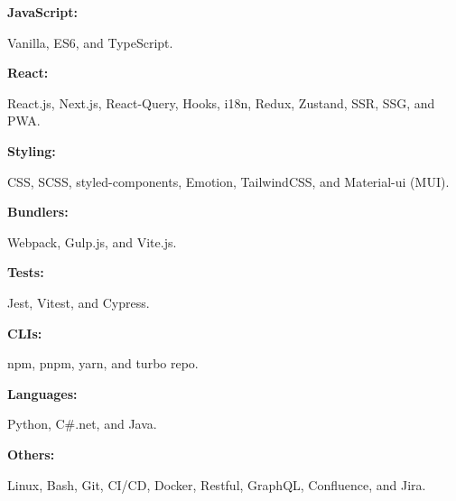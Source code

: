 \documentclass[8pt]{developercv} %
\begin{document}
    \vspace{-10 pt}
    \begin{minipage}[t]{0.1\textwidth}
        \textbf{JavaScript:}
    \end{minipage}
    \hfill
    \begin{minipage}[t]{0.85\textwidth}
        Vanilla, ES6, and TypeScript.
    \end{minipage}
    \begin{minipage}[t]{0.1\textwidth}
        \textbf{React:}
    \end{minipage}
    \hfill
    \begin{minipage}[t]{0.85\textwidth}
        React.js, Next.js, React-Query, Hooks, i18n, Redux, Zustand, SSR, SSG, and PWA.
    \end{minipage}
    \begin{minipage}[t]{0.1\textwidth}
        \textbf{Styling:}
    \end{minipage}
    \hfill
    \begin{minipage}[t]{0.85\textwidth}
        CSS, SCSS, styled-components, Emotion, TailwindCSS, and Material-ui (MUI).
    \end{minipage}
    \begin{minipage}[t]{0.1\textwidth}
        \textbf{Bundlers:}
    \end{minipage}
    \hfill
    \begin{minipage}[t]{0.85\textwidth}
        Webpack, Gulp.js, and Vite.js.
    \end{minipage}
    \begin{minipage}[t]{0.1\textwidth}
        \textbf{Tests:}
    \end{minipage}
    \hfill
    \begin{minipage}[t]{0.85\textwidth}
        Jest, Vitest, and Cypress.
    \end{minipage}
    \begin{minipage}[t]{0.1\textwidth}
        \textbf{CLIs:}
    \end{minipage}
    \hfill
    \begin{minipage}[t]{0.85\textwidth}
        npm, pnpm, yarn, and turbo repo.
    \end{minipage}
    \begin{minipage}[t]{0.1\textwidth}
        \textbf{Languages:}
    \end{minipage}
    \hfill
    \begin{minipage}[t]{0.85\textwidth}
        Python, C\#.net, and Java.
    \end{minipage}
    \begin{minipage}[t]{0.1\textwidth}
        \textbf{Others:}
    \end{minipage}
    \hfill
    \begin{minipage}[t]{0.85\textwidth}
        Linux, Bash, Git, CI/CD, Docker, Restful, GraphQL, Confluence, and Jira.
    \end{minipage}
\end{document}
